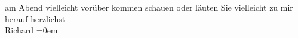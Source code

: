\begin{ledgroupsized}[t]{13cm}
               am Abend {\pb}vielleicht vorüber kommen
               schauen oder läuten Sie vielleicht zu mir herauf\pend
           \pstart
           herzlichst{\\[\baselineskip]}\spacefill\mbox{Richard}\pend
           \leftskip=0em{}\pstart
           \centering{}\label{T_L00421_1v}\label{T_L00421_1h}\pend
           \endnumbering{}\end{ledgroupsized}  \newcommand{\dateiname}{L00421}\newcommand{\titel}{Richard Beer-Hofmann an Arthur Schnitzler, [17. 2. 1895?]}\newcommand{\editorInnen}{Martin Anton Müller und Gerd-Hermann Susen}
            \footnotesize
\begin{ledgroupsized}[t]{11.5cm}
\end{ledgroupsized}
         
      
